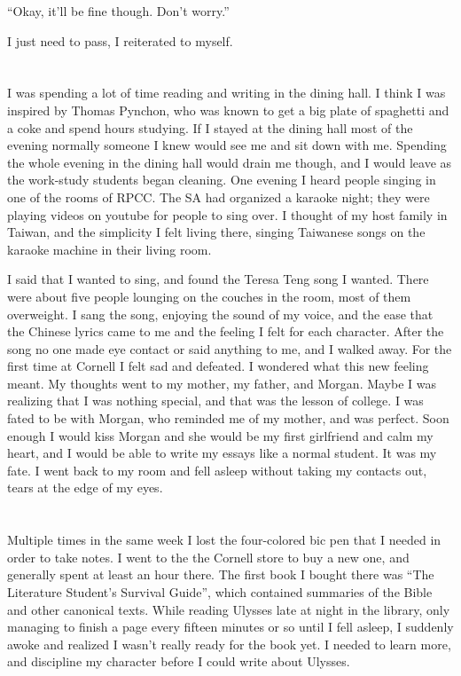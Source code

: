 ``Okay, it'll be fine though.  Don't worry.''

I just need to pass, I reiterated to myself.

\section{}

I was spending a lot of time reading and writing in the dining hall.  I think I
was inspired by Thomas Pynchon, who was known to get a big plate of spaghetti
and a coke and spend hours studying.  If I stayed at the dining hall most of the
evening normally someone I knew would see me and sit down with me.  Spending the
whole evening in the dining hall would drain me though, and I would leave as the
work-study students began cleaning.  One evening I heard people singing in one
of the rooms of RPCC.  The SA had organized a karaoke night; they were playing
videos on youtube for people to sing over.  I thought of my host family in
Taiwan, and the simplicity I felt living there, singing Taiwanese songs on the
karaoke machine in their living room.  

I said that I wanted to sing, and found the Teresa Teng song I wanted.  There
were about five people lounging on the couches in the room, most of them
overweight.  I sang the song, enjoying the sound of my voice, and the ease that
the Chinese lyrics came to me and the feeling I felt for each character.  After
the song no one made eye contact or said anything to me, and I walked away.  For
the first time at Cornell I felt sad and defeated.  I wondered what this new
feeling meant.  My thoughts went to my mother, my father, and Morgan.  Maybe I
was realizing that I was nothing special, and that was the lesson of college.  I
was fated to be with Morgan, who reminded me of my mother, and was perfect.
Soon enough I would kiss Morgan and she would be my first girlfriend and calm my
heart, and I would be able to write my essays like a normal student.  It was my
fate.  I went back to my room and fell asleep without taking my contacts out,
tears at the edge of my eyes.

\section{}

Multiple times in the same week I lost the four-colored bic pen that I needed in
order to take notes.  I went to the the Cornell store to buy a new one, and
generally spent at least an hour there.  The first book I bought there was ``The
Literature Student's Survival Guide'', which contained summaries of the Bible
and other canonical texts.  While reading Ulysses late at night in the library,
only managing to finish a page every fifteen minutes or so until I fell asleep,
I suddenly awoke and realized I wasn't really ready for the book yet.  I needed
to learn more, and discipline my character before I could write about Ulysses.  

